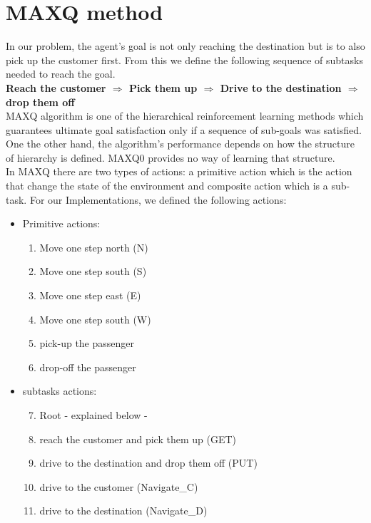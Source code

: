 \documentclass[twoside,twocolumn]{article}
\begin{document}
\section{MAXQ method}
In our problem, the agent's goal is not only reaching the destination but is to also pick up the customer first. From this we define the following sequence of subtasks needed to reach the goal. \\

\textbf{Reach the customer $\Rightarrow$ Pick them up $\Rightarrow$ Drive to the destination $\Rightarrow$ drop them off} \\

MAXQ algorithm is one  of the hierarchical reinforcement learning methods which guarantees ultimate goal satisfaction only if a sequence of sub-goals was satisfied. \\
One the other hand, the algorithm's performance depends on how the structure of hierarchy is defined. MAXQ0 provides no way of learning that structure.\\
In MAXQ there are two types of actions: a primitive action which is the action that change the state of the environment and composite action which is a sub-task. For our Implementations, we defined the following actions:
\begin{itemize}
\item Primitive actions:
\begin{enumerate}
  \item Move one step north (N)
  \item Move one step south (S)
  \item Move one step east (E)
  \item Move one step south (W)
  \item pick-up the passenger
  \item drop-off the passenger
\end{enumerate}
\item subtasks actions:
\begin{enumerate}
  \setcounter{enumi}{6}
  \item Root - explained below -
  \item reach the customer and pick them up (GET)
  \item drive to the destination and drop them off (PUT)
  \item drive to the customer (Navigate\_C)  
  \item drive to the destination (Navigate\_D)
\end{enumerate}
\end{itemize}
\end{document}
